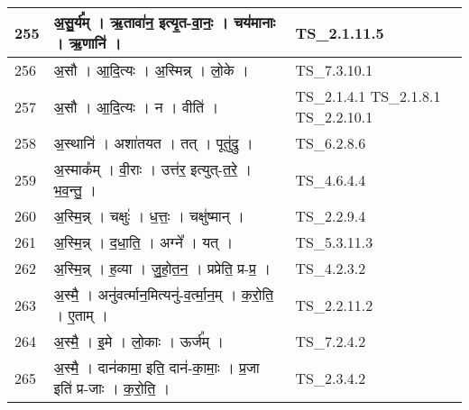\documentclass[17pt]{extarticle}
\begin{document}
\begin{longtable}{||p{0.4in}||p{4.9in}||p{0.9in}||}
    \hline
        
    255 & अ॒सु॒र्य᳚म्   ।   ऋ॒तावा॑न॒ इत्यृ॒त{-}वा॒नः॒   ।   चय॑मानाः   ।   ऋ॒णानि॑   ।    & TS\_2.1.11.5       \\
    
    \hline
        
    256 & अ॒सौ   ।   आ॒दि॒त्यः   ।   अ॒स्मिन्न्   ।   लो॒के   ।    & TS\_7.3.10.1       \\
    
    \hline
        
    257 & अ॒सौ   ।   आ॒दि॒त्यः   ।   न   ।   वीति॑   ।    & TS\_2.1.4.1 TS\_2.1.8.1 TS\_2.2.10.1       \\
    
    \hline
        
    258 & अ॒स्थानि॑   ।   अशा॑तयत   ।   तत्   ।   पूतु॑द्रु   ।    & TS\_6.2.8.6       \\
    
    \hline
        
    259 & अ॒स्माक᳚म्   ।   वी॒राः   ।   उत्त॑र॒ इत्युत्{-}त॒रे॒   ।   भ॒व॒न्तु॒   ।    & TS\_4.6.4.4       \\
    
    \hline
        
    260 & अ॒स्मि॒न्न्   ।   चक्षुः॑   ।   ध॒त्तः॒   ।   चक्षु॑ष्मान्   ।    & TS\_2.2.9.4       \\
    
    \hline
        
    261 & अ॒स्मि॒न्न्   ।   द॒धा॒ति॒   ।   अग्ने᳚   ।   यत्   ।    & TS\_5.3.11.3       \\
    
    \hline
        
    262 & अ॒स्मि॒न्न्   ।   ह॒व्या   ।   जु॒हो॒त॒न॒   ।   प्रप्रेति॒ प्र{-}प्र॒   ।    & TS\_4.2.3.2       \\
    
    \hline
        
    263 & अ॒स्मै॒   ।   अनु॑वर्त्मान॒मित्यनु॑{-}व॒र्त्मा॒न॒म्   ।   क॒रो॒ति॒   ।   ए॒ताम्   ।    & TS\_2.2.11.2       \\
    
    \hline
        
    264 & अ॒स्मै॒   ।   इ॒मे   ।   लो॒काः   ।   ऊर्ज᳚म्   ।    & TS\_7.2.4.2       \\
    
    \hline
        
    265 & अ॒स्मै॒   ।   दान॑कामा॒ इति॒ दान॑{-}का॒माः॒   ।   प्र॒जा इति॑ प्र{-}जाः   ।   क॒रो॒ति॒   ।    & TS\_2.3.4.2       \\
    

\end{longtable}
\end{document}
